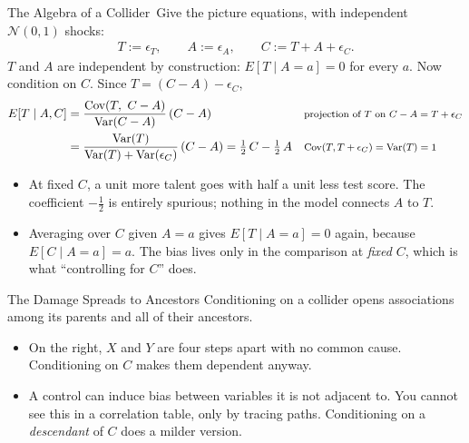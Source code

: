 \documentclass[aspectratio=169,11pt,xcolor=dvipsnames]{beamer}
\DeclareMathOperator{\Cov}{Cov}
\DeclareMathOperator{\Var}{Var}
\newcommand{\E}{E}
\newcommand{\adv}{\,\raisebox{0.6pt}{\textcolor{accent}{$\bigstar$}}}
\begin{document}
\begin{frame}{The Algebra of a Collider\adv}
Give the picture equations, with independent $\mathcal N(0,1)$ shocks:
\begin{align*}
  T := \epsilon_T, \qquad A := \epsilon_A, \qquad C := T + A + \epsilon_C .
\end{align*}
$T$ and $A$ are independent by construction: $\E[T \mid A = a] = 0$ for
every $a$. Now condition on $C$. Since $T = (C - A) - \epsilon_C$,
\begin{align*}
  \E[T \mid A, C]
  &= \frac{\Cov(T,\ C - A)}{\Var(C - A)}\,(C - A)
  && \text{\footnotesize projection of $T$ on $C - A = T + \epsilon_C$} \\
  &= \frac{\Var(T)}{\Var(T) + \Var(\epsilon_C)}\,(C - A)
  = \tfrac12\,C - \tfrac12\,A
  && \text{\footnotesize $\Cov(T, T + \epsilon_C) = \Var(T) = 1$}
\end{align*}
\vskip2pt
\begin{itemize}\itemsep3pt
  \item At fixed $C$, a unit more talent goes with \alert{half a unit less
        test score}. The coefficient $-\tfrac12$ is entirely spurious; nothing
        in the model connects $A$ to $T$.
  \item Averaging over $C$ given $A = a$ gives $\E[T \mid A = a] = 0$ again,
        because $\E[C \mid A = a] = a$. The bias lives only in the
        comparison at \emph{fixed} $C$, which is what ``controlling for
        $C$'' does.
\end{itemize}
\end{frame}

\begin{frame}{The Damage Spreads to Ancestors}
Conditioning on a collider opens associations among its parents \alert{and
all of their ancestors}.
\begin{center}
\end{center}
\begin{itemize}\itemsep1pt
  \item On the right, $X$ and $Y$ are four steps apart with no common
        cause. Conditioning on $C$ makes them dependent anyway.
  \item A control can induce bias between variables it is not adjacent to.
        You cannot see this in a correlation table, only by tracing paths.
        Conditioning on a \emph{descendant} of $C$ does a milder version.
\end{itemize}
\end{frame}
\end{document}

